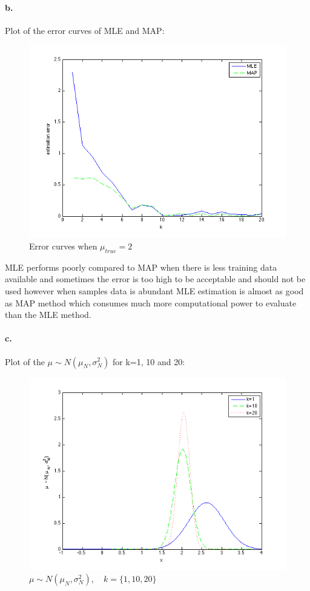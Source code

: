 \documentclass[a4paper]{article}
\begin{document}
\paragraph{b.} Plot of the error curves of MLE and MAP:\\
\begin{figure}[H]
  \centering
    \includegraphics[scale=.47]{images/4_esti_error.png}
  \caption{Error curves when $\mu_{true} = 2$}
\end{figure}

MLE performs poorly compared to MAP when there is less training data available and sometimes the error is too high to be acceptable and should not be used however when samples data is abundant MLE estimation is almost as good as MAP method which consumes much more computational power to evaluate than the MLE method.

\paragraph{c.} Plot of the $\mu \sim N(\mu_{N}, \sigma^{2}_{N})$ for k=1, 10 and 20:\\
\begin{figure}[H]
  \centering
    \includegraphics[scale=.47]{images/4_posterior_pdf.png}
  \caption{$\mu \sim N(\mu_{N}, \sigma^{2}_{N}), \quad k=\{1, 10, 20\}$}
\end{figure}
\end{document}
